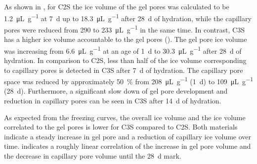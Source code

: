 As shown in , for \ac{C2S} the ice volume of the gel pores was calculated to be \qty{1.2}{\micro\liter\per\gram} at \qty{7}{\day} up to \qty{18.3}{\micro\liter\per\gram} after \qty{28}{\day} of hydration, while the capillary pores were reduced from \num{290} to \qty{233}{\micro\liter\per\gram} in the same time.
In contrast, \ac{C3S} has a higher ice volume accountable to the gel pores ().
The gel pore ice volume was increasing from \qty{6.6}{\micro\liter\per\gram} at an age of \qty{1}{\day} to \qty{30.3}{\micro\liter\per\gram} after \qty{28}{\day} of hydration.
In comparison to \ac{C2S}, less than half of the ice volume corresponding to capillary pores is detected in \ac{C3S} after \qty{7}{\day} of hydration.
The capillary pore space was reduced by approximately \qty{50}{\percent} from \qty{208}{\micro\liter\per\gram} (\qty{1}{\day}) to \qty{109}{\micro\liter\per\gram} (\qty{28}{\day}).
Furthermore, a significant slow down of gel pore development and reduction in capillary pores can be seen in \ac{C3S} after \qty{14}{\day} of hydration.

As expected from the freezing curves, the overall ice volume and the ice volume correlated to the gel pores is lower for \ac{C3S} compared to \ac{C2S}.
Both materials indicate a steady increase in gel pore and a reduction of capillary ice volume over time.
 indicates a roughly linear correlation of the increase in gel pore volume and the decrease in capillary pore volume until the \qty{28}{\day} mark.


